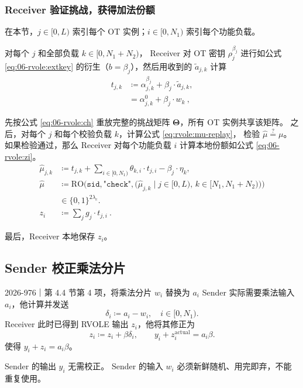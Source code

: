 \subsubsection{Receiver 验证挑战，获得加法份额}

在本节，$j\in[0, L)$ 索引每个 OT 实例；$i\in[0, N_1)$ 索引每个功能负载。

对每个 $j$ 和全部负载 $k \in [0, N_1+N_2)$，
Receiver 对 OT 密钥 $\rho_j^{\beta_j}$ 进行如公式 \eqref{eq:06-rvole:extkey}
的衍生（$b=\beta_j$），然后用收到的 $\tilde a_{j,k}$ 计算
\begin{align}
  t_{j,k} & \coloneq \alpha^{\beta_j}_{j,k}+\beta_j\cdot \tilde{a}_{j,k}, \\
  \tag{tjk}\label{eq:06-rvole:tjk}
          & = \alpha^0_{j,k}+\beta_j\cdot w_{k}~,
\end{align}

先按公式 \eqref{eq:06-rvole:ch} 重放完整的挑战矩阵 $\boldsymbol{\Theta}$，所有 OT 实例共享该矩阵。
之后，对每个 $j$ 和每个校验负载 $k$，计算公式 \eqref{eq:rvole:mu-replay}，
检验 $\hat\mu\stackrel{?}{=}\mu$。
如果检验通过，那么 Receiver 对每个功能负载 $i$ 计算本地份额如公式 \eqref{eq:06-rvole:zi}。
\begin{align*}
  \hat\mu_{j,k} & \coloneq t_{j,k}
  + \sum_{i\in[0,N_1)} \theta_{k,i}\cdot t_{j,i}
  - \beta_j\cdot\eta_k,
  \\
  \label{eq:rvole:mu-replay}\tag{mu-eval}
  \hat\mu       & \coloneq \mathrm{RO}\bigl(\mathtt{sid},\texttt{"check"},
  \bigl(\hat\mu_{j,k} \mid j\in[0,L),\,k\in[N_1,N_1+N_2)\bigr)\bigr)
  \\ &
  \in \{0,1\}^{2\lambda_c}.
  \\
  \label{eq:06-rvole:zi}\tag{zi}
  z_{i}         & \coloneq \sum_{j}g_j\cdot t_{j,i} ~.
\end{align*}

最后，Receiver 本地保存 $z_{i}$。

\subsection{Sender 校正乘法分片}
\label{sec:rvole:chosen-input}

\begin{patchnote}{2026-976｜第 4.4 节第 4 项，将乘法分片 $w_i$ 替换为 $a_i$}
  Sender 实际需要乘法输入 $a_i$，他计算并发送
  \begin{equation}\label{eq:rvole:input-shift}
    \delta_i\coloneq a_i-w_i,
    \quad i\in[0,N_1).
  \end{equation}
  Receiver 此时已得到 RVOLE 输出 $z_i$，他将其修正为
  \begin{equation}\label{eq:rvole:shifted-output}
    z_i\coloneq z_i+\beta\delta_i,
    \qquad y_i+z_i^{\mathrm{actual}}=a_i\beta.
  \end{equation}
  使得 $y_i+z_i = a_i\beta$。
  
  Sender 的输出 $y_i$ 无需校正。
  Sender 的输入 $w_i$ 必须新鲜随机、用完即弃，不能重复使用。
\end{patchnote}

